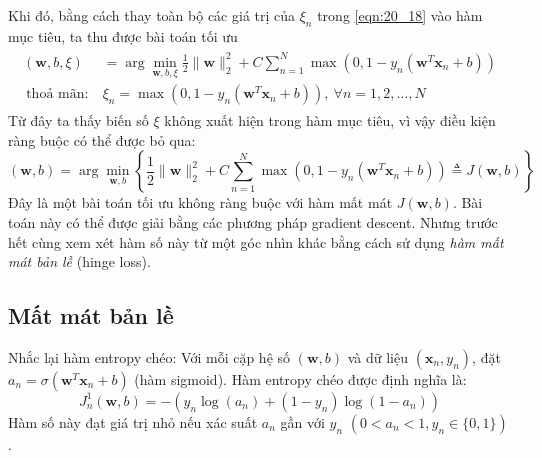 Khi đó, bằng cách thay toàn bộ các giá trị của $\xi_n$ trong \eqref{eqn:20_18}
vào hàm mục tiêu, ta thu được bài toán tối ưu
\begin{eqnarray}
\label{eqn:20_19}
\begin{aligned}
(\mathbf{w}, b, \xi) &= \arg \min_{\mathbf{w}, b, \xi}
\frac{1}{2}{\|\mathbf{w}\|_2^2} + C \sum_{n=1}^N \max(0, 1 - y_n(\mathbf{w}^T\mathbf{x}_n + b)) \\\
\text{thoả mãn:}~ & \xi_n = \max(0, 1 - y_n(\mathbf{w}^T\mathbf{x}_n + b)), ~\forall n = 1, 2, \dots, N
\end{aligned}
\end{eqnarray}
Từ đây ta thấy biến số $\xi$ không xuất hiện trong hàm mục tiêu, vì vậy điều kiện ràng buộc có thể được bỏ qua:
\begin{equation}
\label{eqn:20_20}
(\mathbf{w}, b)= \arg \min_{\mathbf{w}, b} \left\{
\frac{1}{2}{\|\mathbf{w}\|_2^2} + C \sum_{n=1}^N \max(0, 1 -
y_n(\mathbf{w}^T\mathbf{x}_n + b)) \triangleq J(\mathbf{w}, b) \right\}
\end{equation}
Đây là một bài toán tối ưu không ràng buộc với hàm mất mát $J(\mathbf{w}, b)$.
Bài toán này có thể được giải bằng các phương pháp gradient descent. Nhưng trước
hết cùng xem xét hàm số này từ một góc nhìn khác bằng
cách sử dụng \textit{hàm mất mát bản lề} (hinge loss).

\subsection{Mất mát bản lề}
Nhắc lại hàm entropy chéo: Với mỗi cặp hệ số $(\mathbf{w},
b)$ và dữ liệu $(\mathbf{x}_n, y_n)$, đặt $a_n = \sigma(\mathbf{w}^T\mathbf{x}_n +
b)$ (hàm sigmoid). Hàm
entropy chéo được định nghĩa là:
\begin{equation} J_n^1(\mathbf{w}, b)
= -(y_n \log(a_n) + (1 - y_n) \log(1 - a_n))
\end{equation}
Hàm số này đạt giá trị nhỏ nếu xác suất $a_n$
gần với $y_n$ $(0 < a_n < 1, y_n \in \{0, 1\})$.

